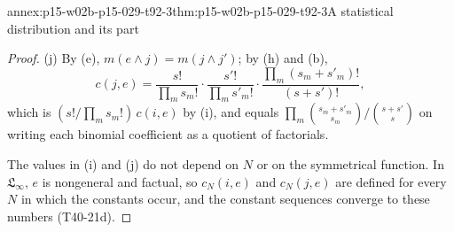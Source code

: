 \begin{annexitem}{annex:p15-w02b-p15-029-t92-3}{thm:p15-w02b-p15-029-t92-3}{A statistical distribution and its part}
\begin{proof}
(j) By (e), \(m(e\land j)=m(j\land j')\); by (h) and (b),
\[
 c(j,e)=\frac{s!}{\prod_ms_m!}\cdot\frac{s'!}{\prod_ms'_m!}\cdot
 \frac{\prod_m(s_m+s'_m)!}{(s+s')!},
\]
which is \((s!/\prod_ms_m!)\,c(i,e)\) by (i), and equals
\(\prod_m\binom{s_m+s'_m}{s_m}/\binom{s+s'}{s}\) on writing each
binomial coefficient as a quotient of factorials.

The values in (i) and (j) do not depend on \(N\) or on the symmetrical
function. In \(\mathfrak L_\infty\), \(e\) is nongeneral and
factual, so \(c_N(i,e)\) and \(c_N(j,e)\) are defined for every \(N\)
in which the constants occur, and the constant sequences converge to
these numbers (T40-21d).
\end{proof}
\end{annexitem}
